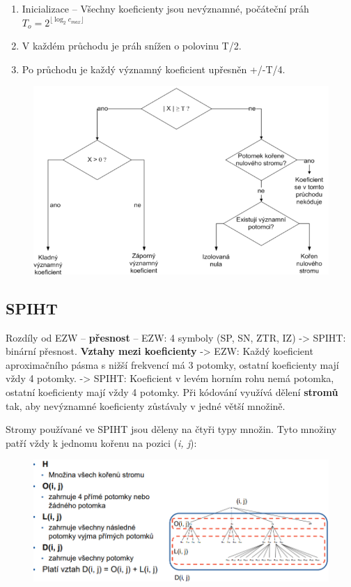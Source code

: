 \begin{enumerate}
    \item Inicializace -- Všechny koeficienty jsou nevýznamné, počáteční práh $T_o = 2^{\lfloor \log_2 c_{max} \rfloor}$
    \item V každém průchodu je práh snížen o polovinu T/2.
    \item Po průchodu je každý významný koeficient upřesněn +/-T/4.
\end{enumerate}

\begin{figure}[ht]
    \centering
    \includegraphics[width=0.6\linewidth]{MPC-ZMD//images/ezw.png}
\end{figure}
\FloatBarrier


\subsection{SPIHT}

Rozdíly od EZW -- \textbf{přesnost} -- EZW: 4 symboly (SP, SN, ZTR, IZ) -> SPIHT: binární přesnost. \textbf{Vztahy mezi koeficienty} -> EZW: Každý koeficient aproximačního pásma s nižší frekvencí má 3 potomky, ostatní koeficienty mají vždy 4 potomky. -> SPIHT: Koeficient v levém horním rohu nemá potomka, ostatní koeficienty mají
vždy 4 potomky. Při kódování využívá dělení \textbf{stromů} tak, aby nevýznamné koeficienty zůstávaly v jedné větší množině.

Stromy používané ve SPIHT jsou děleny na čtyři typy množin. Tyto množiny patří
vždy k jednomu kořenu na pozici (\textit{i, j}):

\begin{figure}[ht]
    \centering
    \includegraphics[width=0.7\linewidth]{MPC-ZMD//images/spiht.png}
\end{figure}
\FloatBarrier

